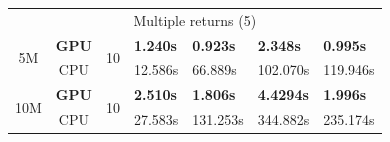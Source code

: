 \begin{table}[hb]
\begin{tabular}{c|c|c|llll}
    \cmidrule{1-7}
    \multicolumn{7}{c}{Multiple returns (5)}\\
    \cmidrule{1-7}
    \multirow{2}{*}{5M} & \textbf{GPU} & \multirow{2}{*}{10} & 
    \textbf{1.240s} & \textbf{0.923s} & \textbf{2.348s} & \textbf{0.995s}\\ 
    & CPU & & 
    12.586s & 66.889s & 102.070s & 119.946s\\
    \cmidrule{1-7}
    \multirow{2}{*}{10M} & \textbf{GPU} & \multirow{2}{*}{10} & 
    \textbf{2.510s} & \textbf{1.806s} & \textbf{4.4294s} & \textbf{1.996s}\\ 
    & CPU & & 
    27.583s & 131.253s & 344.882s & 235.174s\\
    \bottomrule
    \end{tabular}
    \libertineNormal
\end{table}
\renewcommand{\arraystretch}{1}